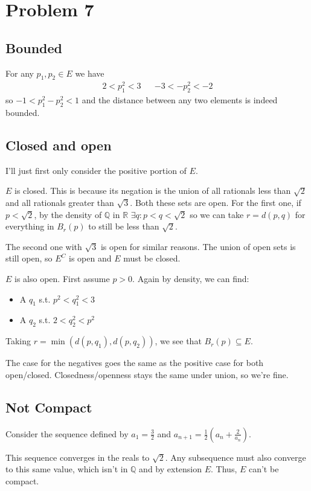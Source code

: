 \documentclass[12pt]{article}
\newcommand{\R}{\mathbb{R}}
\newcommand{\Q}{\mathbb{Q}}
\begin{document}
\pagebreak

\section{Problem 7}

\subsection{Bounded}

For any $p_1, p_2 \in E$ we have
\begin{align*}
  2 < p_1^2 < 3 &  & -3 < -p_2^2 < -2
\end{align*}
so $-1 < p_1^2-p_2^2 < 1$ and the distance between any two elements is indeed bounded.

\subsection{Closed and open}

I'll just first only consider the positive portion of $E$.

$E$ is closed.
This is because its negation is the union of all rationals less than $\sqrt{2}$ and all rationals greater than $\sqrt{3}$.
Both these sets are open.
For the first one, if $p < \sqrt{2}$,
by the density of $\Q$ in $\R$ $\exists q: p < q < \sqrt{2}$ so we can take
$r=d(p, q)$ for everything in $B_r(p)$ to still be less than $\sqrt{2}$.

The second one with $\sqrt{3}$ is open for similar reasons.
The union of open sets is still open, so $E^C$ is open and $E$ must be closed.

$E$ is also open.
First assume $p > 0$.
Again by density, we can find:
\begin{itemize}[nolistsep]
  \item A $q_1$ s.t. $p^2 < q_1^2 < 3$
  \item A $q_2$ s.t. $2 < q_2^2 < p^2$
\end{itemize}
Taking $r=\min(d(p, q_1), d(p, q_2))$, we see that $B_r(p) \subseteq E$.

The case for the negatives goes the same as the positive case for both open/closed.
Closedness/openness stays the same under union, so we're fine.

\subsection{Not Compact}

Consider the sequence defined by $a_1=\frac{3}{2}$ and $a_{n+1}=\frac{1}{2}\left(a_n+\frac{2}{a_n}\right)$.

This sequence converges in the reals to $\sqrt{2}$.
Any subsequence must also converge to this same value, which isn't in $\Q$ and by extension $E$.
Thus, $E$ can't be compact.
\end{document}
